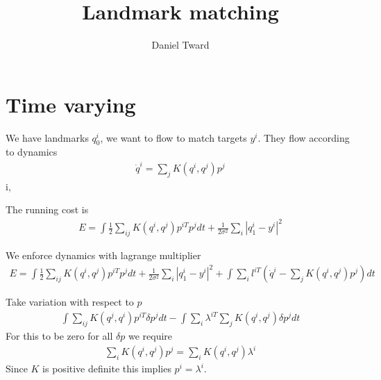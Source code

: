\documentclass{article}
\author{Daniel Tward}
\title{Landmark matching}
\begin{document}
\maketitle 


\section{Time varying}
We have landmarks $q_0^i$, we want to flow to match targets $y^i$.  They flow according to dynamics 
\begin{align*}
\dot q^i = \sum_j K(q^i,q^j)p^j
\end{align*}i,

The running cost is
\begin{align*}
E = \int \frac12 \sum_{ij} K(q^i,q^j)p^{iT}p^jdt + \frac{1}{2\sigma^2}\sum_i |q_1^i - y^i|^2
\end{align*}

We enforce dynamics with lagrange multiplier
\begin{align*}
E = \int \frac12 \sum_{ij} K(q^i,q^j)p^{iT}p^jdt + \frac{1}{2\sigma^2}\sum_i |q_1^i - y^i|^2  + \int \sum_i l^{iT}(\dot q^i - \sum_j K(q^i,q^j)p^j)dt
\end{align*}

Take variation with respect to $p$
\begin{align*}
\int \sum_{ij} K(q^j,q^i)p^{iT}\delta p^j dt - \int \sum_i \lambda^{iT}\sum_j K(q^i,q^j)\delta p^j dt
\end{align*}
For this to be zero for all $\delta p$ we require
\begin{align*}
\sum_{i} K(q^i,q^j) p^j = \sum_{i}K(q^i,q^j)\lambda^i
\end{align*}
Since $K$ is positive definite this implies $p^i = \lambda^i$.
\end{document}
